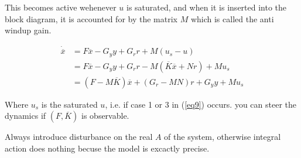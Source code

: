 \documentclass[a4paper]{article}
\begin{document}
This becomes active wehenever $ u $ is saturated, and when it is inserted into the block diagram, it is accounted for by the matrix  $ M $  which is called the anti windup gain.

\begin{align}
	\dot{\overline{x}} &= F \overline{x} - G_y y + G_r r + M(u_s - u)\\
					   &=  F \overline{x} - G_y y + G_r r - M(\overline{K} \overline{x} + N r) + M u_s\\ &= (F - M \overline{K})\overline{x} + (G_r - M N) r + G_y y + M u_s
\end{align}

Where $ u_s $ is the saturated  $ u $, i.e. if case 1 or 3 in (\ref{eq9}) occurs.
you can steer the dynamics if $ (F, \overline{K}) $ is observable. 

Always introduce disturbance on the real $ A $ of the system, otherwise integral action does nothing becuse the model is excactly precise. 
\end{document}
